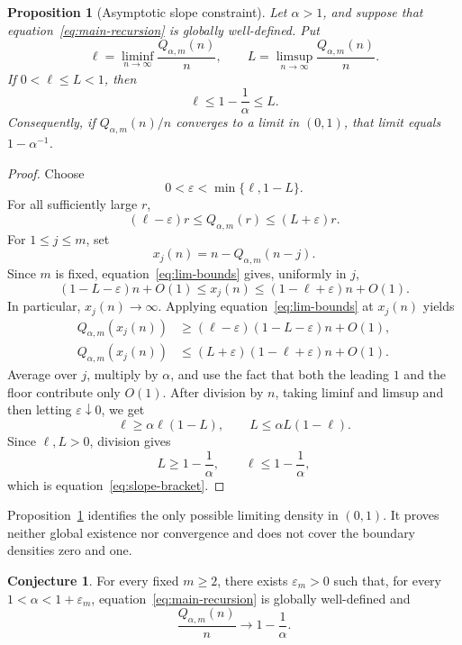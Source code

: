 \documentclass[11pt]{article}
\newtheorem{proposition}[theorem]{Proposition}
\theoremstyle{definition}
\newtheorem{conjecture}[theorem]{Conjecture}
\theoremstyle{remark}
\begin{document}
\begin{proposition}[Asymptotic slope constraint]\label{prop:slope}
Let $\alpha>1$, and suppose that equation~\eqref{eq:main-recursion} is
globally well-defined.  Put
\[
\ell=\liminf_{n\to\infty}\frac{Q_{\alpha,m}(n)}n,
\qquad
L=\limsup_{n\to\infty}\frac{Q_{\alpha,m}(n)}n.
\]
If $0<\ell\le L<1$, then
\begin{equation}\label{eq:slope-bracket}
\ell\le1-\frac1\alpha\le L.
\end{equation}
Consequently, if $Q_{\alpha,m}(n)/n$ converges to a limit in $(0,1)$, that
limit equals $1-\alpha^{-1}$.
\end{proposition}

\begin{proof}
Choose
\[
0<\varepsilon<\min\{\ell,1-L\}.
\]
For all sufficiently large $r$,
\begin{equation}\label{eq:lim-bounds}
(\ell-\varepsilon)r
\le Q_{\alpha,m}(r)
\le (L+\varepsilon)r.
\end{equation}
For $1\le j\le m$, set
\[
x_j(n)=n-Q_{\alpha,m}(n-j).
\]
Since $m$ is fixed, equation~\eqref{eq:lim-bounds} gives, uniformly in $j$,
\begin{equation}\label{eq:x-bounds}
(1-L-\varepsilon)n+O(1)
\le x_j(n)
\le(1-\ell+\varepsilon)n+O(1).
\end{equation}
In particular, $x_j(n)\to\infty$.  Applying
equation~\eqref{eq:lim-bounds} at $x_j(n)$ yields
\begin{align*}
Q_{\alpha,m}(x_j(n))
&\ge
(\ell-\varepsilon)(1-L-\varepsilon)n+O(1),\\
Q_{\alpha,m}(x_j(n))
&\le
(L+\varepsilon)(1-\ell+\varepsilon)n+O(1).
\end{align*}
Average over $j$, multiply by $\alpha$, and use the fact that both the
leading $1$ and the floor contribute only $O(1)$.  After division by $n$,
taking liminf and limsup and then letting $\varepsilon\downarrow0$, we get
\[
\ell\ge\alpha\ell(1-L),
\qquad
L\le\alpha L(1-\ell).
\]
Since $\ell,L>0$, division gives
\[
L\ge1-\frac1\alpha,
\qquad
\ell\le1-\frac1\alpha,
\]
which is equation~\eqref{eq:slope-bracket}.
\end{proof}

Proposition~\ref{prop:slope} identifies the only possible limiting density
in $(0,1)$.  It proves neither global existence nor convergence and does not
cover the boundary densities zero and one.

\begin{conjecture}\label{conj:supercritical}
For every fixed $m\ge2$, there exists $\varepsilon_m>0$ such that, for every
$1<\alpha<1+\varepsilon_m$, equation~\eqref{eq:main-recursion} is globally
well-defined and
\[
\frac{Q_{\alpha,m}(n)}n
\longrightarrow
1-\frac1\alpha.
\]
\end{conjecture}
\end{document}
